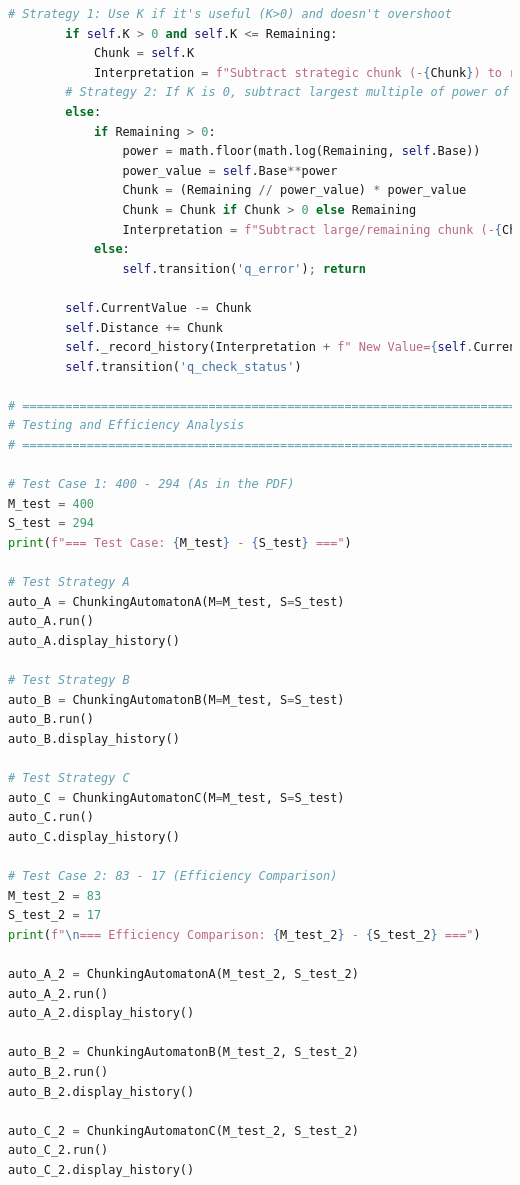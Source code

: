 \documentclass[11pt]{article}
\begin{document}
\begin{lstlisting}[language=Python]
        # Strategy 1: Use K if it's useful (K>0) and doesn't overshoot
        if self.K > 0 and self.K <= Remaining:
            Chunk = self.K
            Interpretation = f"Subtract strategic chunk (-{Chunk}) to reach base."
        # Strategy 2: If K is 0, subtract largest multiple of power of base possible.
        else:
            if Remaining > 0:
                power = math.floor(math.log(Remaining, self.Base))
                power_value = self.Base**power
                Chunk = (Remaining // power_value) * power_value
                Chunk = Chunk if Chunk > 0 else Remaining
                Interpretation = f"Subtract large/remaining chunk (-{Chunk})."
            else:
                self.transition('q_error'); return

        self.CurrentValue -= Chunk
        self.Distance += Chunk
        self._record_history(Interpretation + f" New Value={self.CurrentValue}.", CV=self.CurrentValue, Dist=self.Distance, K=self.K)
        self.transition('q_check_status')

# =============================================================================
# Testing and Efficiency Analysis
# =============================================================================

# Test Case 1: 400 - 294 (As in the PDF)
M_test = 400
S_test = 294
print(f"=== Test Case: {M_test} - {S_test} ===")

# Test Strategy A
auto_A = ChunkingAutomatonA(M=M_test, S=S_test)
auto_A.run()
auto_A.display_history()

# Test Strategy B
auto_B = ChunkingAutomatonB(M=M_test, S=S_test)
auto_B.run()
auto_B.display_history()

# Test Strategy C
auto_C = ChunkingAutomatonC(M=M_test, S=S_test)
auto_C.run()
auto_C.display_history()

# Test Case 2: 83 - 17 (Efficiency Comparison)
M_test_2 = 83
S_test_2 = 17
print(f"\n=== Efficiency Comparison: {M_test_2} - {S_test_2} ===")

auto_A_2 = ChunkingAutomatonA(M_test_2, S_test_2)
auto_A_2.run()
auto_A_2.display_history()

auto_B_2 = ChunkingAutomatonB(M_test_2, S_test_2)
auto_B_2.run()
auto_B_2.display_history()

auto_C_2 = ChunkingAutomatonC(M_test_2, S_test_2)
auto_C_2.run()
auto_C_2.display_history()
\end{lstlisting}

\printbibliography
\end{document}
